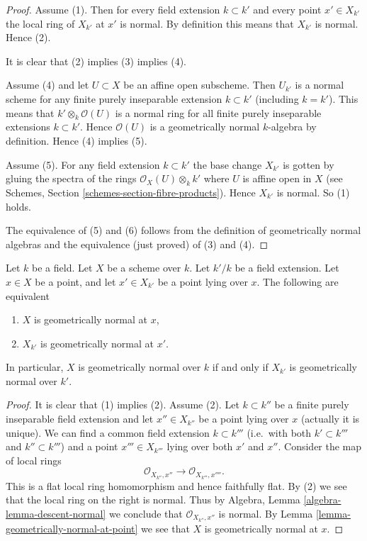 \begin{proof}
Assume (1). Then for every field extension $k \subset k'$ and
every point $x' \in X_{k'}$ the local ring of $X_{k'}$ at $x'$
is normal. By definition this means that $X_{k'}$ is normal.
Hence (2).

\medskip\noindent
It is clear that (2) implies (3) implies (4).

\medskip\noindent
Assume (4) and let $U \subset X$ be an affine open subscheme.
Then $U_{k'}$ is a normal scheme for any finite purely inseparable
extension $k \subset k'$ (including $k = k'$). This means that
$k' \otimes_k \mathcal{O}(U)$ is a normal ring for all
finite purely inseparable extensions $k \subset k'$. Hence
$\mathcal{O}(U)$ is a geometrically normal $k$-algebra by definition.
Hence (4) implies (5).

\medskip\noindent
Assume (5). For any field extension $k \subset k'$ the base
change $X_{k'}$ is gotten by gluing the spectra of the
rings $\mathcal{O}_X(U) \otimes_k k'$ where $U$ is affine open
in $X$ (see Schemes, Section \ref{schemes-section-fibre-products}).
Hence $X_{k'}$ is normal. So (1) holds.

\medskip\noindent
The equivalence of (5) and (6) follows from the definition
of geometrically normal algebras and the equivalence (just proved)
of (3) and (4).
\end{proof}

\begin{lemma}
\label{lemma-geometrically-normal-upstairs}
Let $k$ be a field.
Let $X$ be a scheme over $k$.
Let $k'/k$ be a field extension.
Let $x \in X$ be a point, and let $x' \in X_{k'}$ be a point lying over $x$.
The following are equivalent
\begin{enumerate}
\item $X$ is geometrically normal at $x$,
\item $X_{k'}$ is geometrically normal at $x'$.
\end{enumerate}
In particular, $X$ is geometrically normal over $k$ if and only if
$X_{k'}$ is geometrically normal over $k'$.
\end{lemma}

\begin{proof}
It is clear that (1) implies (2). Assume (2).
Let $k \subset k''$ be a finite purely inseparable field extension
and let $x'' \in X_{k''}$ be a point lying over $x$ (actually it is
unique). We can find a common field extension $k \subset k'''$
(i.e.\ with both $k' \subset k'''$ and $k'' \subset k'''$) and a point
$x''' \in X_{k'''}$ lying over both $x'$ and $x''$.
Consider the map of local rings
$$
\mathcal{O}_{X_{k''}, x''} \longrightarrow \mathcal{O}_{X_{k'''}, x''''}.
$$
This is a flat local ring homomorphism and hence faithfully flat.
By (2) we see that the local ring on the right is normal.
Thus by Algebra, Lemma \ref{algebra-lemma-descent-normal}
we conclude that $\mathcal{O}_{X_{k''}, x''}$ is normal.
By Lemma \ref{lemma-geometrically-normal-at-point} we see that $X$
is geometrically normal at $x$.
\end{proof}

